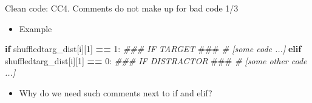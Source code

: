 \documentclass[
  8pt,
  ignorenonframetext,
]{beamer}
\newenvironment{Shaded}{\begin{snugshade}}{\end{snugshade}}
\newcommand{\AlertTok}[1]{\textcolor[rgb]{0.94,0.16,0.16}{#1}}
\newcommand{\CommentTok}[1]{\textcolor[rgb]{0.56,0.35,0.01}{\textit{#1}}}
\newcommand{\ControlFlowTok}[1]{\textcolor[rgb]{0.13,0.29,0.53}{\textbf{#1}}}
\newcommand{\DecValTok}[1]{\textcolor[rgb]{0.00,0.00,0.81}{#1}}
\newcommand{\NormalTok}[1]{#1}
\newcommand{\OperatorTok}[1]{\textcolor[rgb]{0.81,0.36,0.00}{\textbf{#1}}}
\providecommand{\tightlist}{%
  \setlength{\itemsep}{0pt}\setlength{\parskip}{0pt}}
\begin{document}
\begin{frame}[fragile]{Clean code: CC4. Comments do not make up for bad
code 1/3}
\protect\hypertarget{clean-code-cc4.-comments-do-not-make-up-for-bad-code-13}{}
\begin{itemize}
\tightlist
\item
  Example
\end{itemize}

\begin{Shaded}
\begin{Highlighting}[]
\ControlFlowTok{if}\NormalTok{ shuffledtarg\_dist[i][}\DecValTok{1}\NormalTok{] }\OperatorTok{==} \DecValTok{1}\NormalTok{: }\CommentTok{\#\#\# IF TARGET }\AlertTok{\#\#\#}
    \CommentTok{\# [some code ...]}
\ControlFlowTok{elif}\NormalTok{ shuffledtarg\_dist[i][}\DecValTok{1}\NormalTok{] }\OperatorTok{==} \DecValTok{0}\NormalTok{: }\CommentTok{\#\#\# IF DISTRACTOR }\AlertTok{\#\#\#}
    \CommentTok{\# [some other code ...]}
\end{Highlighting}
\end{Shaded}

\begin{itemize}
\tightlist
\item
  Why do we need such comments next to if and elif?
\end{itemize}
\end{frame}
\end{document}

